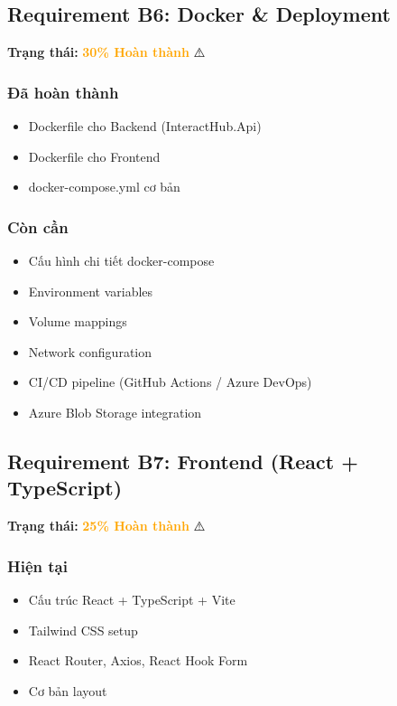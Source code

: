 \documentclass[12pt,a4paper]{report}
\begin{document}
\subsection{Requirement B6: Docker \& Deployment}
\textbf{Trạng thái: } \textcolor{orange}{\textbf{30\% Hoàn thành}} ⚠️

\subsubsection{Đã hoàn thành}
\begin{itemize}
    \item[$\checkmark$] Dockerfile cho Backend (InteractHub.Api)
    \item[$\checkmark$] Dockerfile cho Frontend
    \item[$\checkmark$] docker-compose.yml cơ bản
\end{itemize}

\subsubsection{Còn cần}
\begin{itemize}
    \item Cấu hình chi tiết docker-compose
    \item Environment variables
    \item Volume mappings
    \item Network configuration
    \item CI/CD pipeline (GitHub Actions / Azure DevOps)
    \item Azure Blob Storage integration
\end{itemize}

\subsection{Requirement B7: Frontend (React + TypeScript)}
\textbf{Trạng thái: } \textcolor{orange}{\textbf{25\% Hoàn thành}} ⚠️

\subsubsection{Hiện tại}
\begin{itemize}
    \item Cấu trúc React + TypeScript + Vite
    \item Tailwind CSS setup
    \item React Router, Axios, React Hook Form
    \item Cơ bản layout
\end{itemize}
\end{document}
